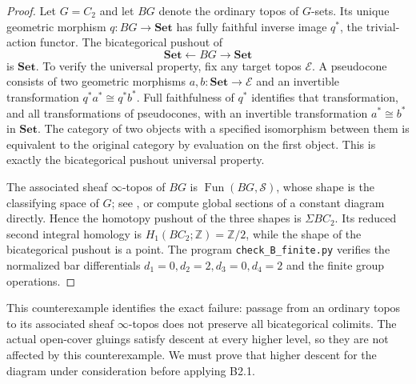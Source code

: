 \begin{proof}
Let $G=C_2$ and let $BG$ denote the ordinary topos of $G$-sets. Its
unique geometric morphism $q:BG\to\mathbf{Set}$ has fully faithful
inverse image $q^*$, the trivial-action functor. The bicategorical
pushout of
\[
 \mathbf{Set}\longleftarrow BG\longrightarrow\mathbf{Set}
 \tag{B2.3}
\]
is $\mathbf{Set}$. To verify the universal property, fix any target
topos $\mathcal E$. A pseudocone consists of two geometric morphisms
$a,b:\mathbf{Set}\to\mathcal E$ and an invertible transformation
$q^*a^*\cong q^*b^*$. Full faithfulness of $q^*$ identifies that
transformation, and all transformations of pseudocones, with an
invertible transformation $a^*\cong b^*$ in $\mathbf{Set}$. The category
of two objects with a specified isomorphism between them is equivalent
to the original category by evaluation on the first object. This is
exactly the bicategorical pushout universal property.

The associated sheaf $\infty$-topos of $BG$ is
$\operatorname{Fun}(BG,\mathcal S)$, whose shape is the classifying
space of $G$; see \cite[Example 4.2.3]{BGHExodromy}, or compute global
sections of a constant diagram directly. Hence the homotopy pushout of
the three shapes is $\Sigma BC_2$. Its reduced second integral homology
is $H_1(BC_2;\mathbb Z)=\mathbb Z/2$, while the shape of the
bicategorical pushout is a point. The program
\texttt{check\_B\_finite.py} verifies the normalized bar differentials
$d_1=0,d_2=2,d_3=0,d_4=2$ and the finite group operations.
\end{proof}

This counterexample identifies the exact failure: passage from an
ordinary topos to its associated sheaf $\infty$-topos does not preserve
all bicategorical colimits. The actual open-cover gluings satisfy
descent at every higher level, so they are not affected by this
counterexample. We must prove that higher descent for the diagram
under consideration before applying B2.1.

